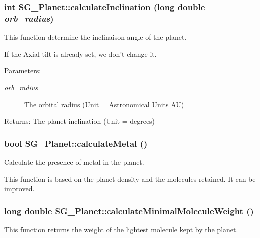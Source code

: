 \subsubsection{\setlength{\rightskip}{0pt plus 5cm}int SG\_\-Planet::calculate\-Inclination (long double {\em orb\_\-radius})\hspace{0.3cm}{\tt  [protected]}}\label{class_s_g___planet_b5}


This function determine the inclinaison angle of the planet. 

If the Axial tilt is already set, we don't change it. \begin{Desc}
\item[Parameters:]
\begin{description}
\item[{\em orb\_\-radius}]The orbital radius (Unit = Astronomical Units AU) \end{description}
\end{Desc}
\begin{Desc}
\item[Returns:]The planet inclination (Unit = degrees) \end{Desc}
\subsubsection{\setlength{\rightskip}{0pt plus 5cm}bool SG\_\-Planet::calculate\-Metal ()\hspace{0.3cm}{\tt  [protected]}}\label{class_s_g___planet_b12}


Calculate the presence of metal in the planet. 

This function is based on the planet density and the molecules retained. It can be improved. 
\subsubsection{\setlength{\rightskip}{0pt plus 5cm}long double SG\_\-Planet::calculate\-Minimal\-Molecule\-Weight ()\hspace{0.3cm}{\tt  [protected]}}\label{class_s_g___planet_b27}


This function returns the weight of the lightest molecule kept by the planet. 

